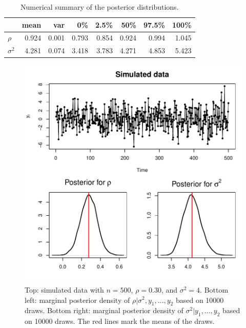 \documentclass[12pt]{article}
\begin{document}
\begin{table}[H]
\begin{center}
\begin{tabular}{l|rrrrrrr}
           &  mean & var   & 0\%   & 2.5\% & 50\%  & 97.5\% & 100\% \\ \hline\hline
$\rho$     & 0.924 & 0.001 & 0.793 & 0.854 & 0.924 & 0.994  & 1.045 \\ 
$\sigma^2$ & 4.281 & 0.074 & 3.418 & 3.783 & 4.271 & 4.853  & 5.423 \\
\end{tabular}
\end{center}
\caption{Numerical summary of the posterior distributions.}
\end{table}

\newpage

\begin{figure}[H]
\begin{center}
\includegraphics[scale=1.00]{figs/fig_2.pdf}
\end{center}
\caption{Top: simulated data with $n=500$, $\rho=0.30$, and $\sigma^2=4$. Bottom left: marginal posterior density of $\rho|\sigma^2,y_1,\ldots,y_2$ based on 10000 draws. Bottom right: marginal posterior density of $\sigma^2|y_1,\ldots,y_2$ based on 10000 draws. The red lines mark the means of the draws.}
\end{figure}
\bigskip
\end{document}
